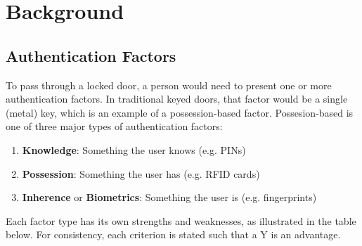 \section{Background}

\subsection{Authentication Factors}
To pass through a locked door, a person would need to present one or more authentication factors. In traditional keyed doors, that factor would be a single (metal) key, which is an example of a possession-based factor. Possesion-based is one of three major types of authentication factors:
\begin{enumerate}
	\item \textbf{Knowledge}: Something the user knows (e.g. PINs)
	\item \textbf{Possession}: Something the user has (e.g. RFID cards)
	\item \textbf{Inherence} or \textbf{Biometrics}: Something the user is (e.g. fingerprints)
\end{enumerate}

Each factor type has its own strengths and weaknesses, as illustrated in the table below. For consistency, each criterion is stated such that a Y is an advantage.

